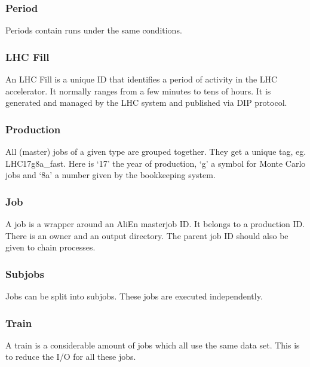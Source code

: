 \subsubsection{Period}
Periods contain runs under the same conditions.

\subsubsection{LHC Fill}
An LHC Fill is a unique ID that identifies a period of activity in the LHC accelerator. It normally ranges from a few minutes to tens of hours. It is generated and managed by the LHC system and published via DIP protocol. 

\subsubsection{Production}
All (master) jobs of a given type are grouped together. They get a unique tag, eg. LHC17g8a\_fast. Here is `17' the year of production, `g' a symbol for Monte Carlo jobs and `8a' a number given by the bookkeeping system. 

\subsubsection{Job}
A job is a wrapper around an AliEn masterjob ID. It belongs to a production ID. There is an owner and an output directory. The parent job ID should also be given to chain processes. 

\subsubsection{Subjobs}
Jobs can be split into subjobs. These jobs are executed independently.

\subsubsection{Train}
A train is a considerable amount of jobs which all use the same data set. This is to reduce the I/O for all these jobs.

